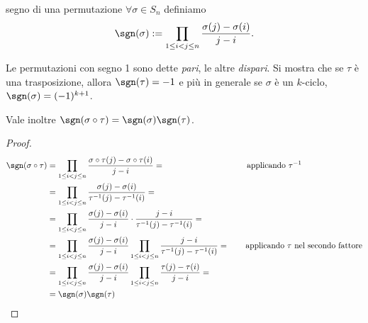 \begin{definition}{segno di una permutazione}
    $\forall \sigma \in S_n$ definiamo \[ \sgn(\sigma) := \prod_{1\leq i<j\leq n} \frac{\sigma(j)-\sigma(i)}{j-i}. \]
\end{definition}
Le permutazioni con segno 1 sono dette \emph{pari}, le altre \emph{dispari}. Si mostra che se $\tau$ è una trasposizione, allora $\sgn(\tau) = -1$ e più in generale se $\sigma$ è un $k$-ciclo, $\sgn(\sigma) = (-1)^{k+1}$.

Vale inoltre $\sgn (\sigma \circ \tau) = \sgn (\sigma)\sgn(\tau)$.
    \begin{proof}
        \begin{align*}
            \sgn(\sigma \circ \tau) & =  \prod_{1\leq i<j\leq n} \frac{\sigma \circ \tau(j)-\sigma \circ \tau(i)}{j-i} = \qquad\qquad\qquad\qquad\qquad\text{applicando $\tau^{-1}$}\\
            & = \prod_{1\leq i<j\leq n} \frac{\sigma(j)-\sigma(i)}{\tau^{-1}(j)-\tau^{-1}(i)} = \\
            & = \prod_{1\leq i<j\leq n} \frac{\sigma(j)-\sigma(i)}{j-i}\cdot \frac{j-i}{\tau^{-1}(j)-\tau^{-1}(i)} = \\
            & = \prod_{1\leq i<j\leq n} \frac{\sigma(j)-\sigma(i)}{j-i} \prod_{1\leq i<j\leq n}  \frac{j-i}{\tau^{-1}(j)-\tau^{-1}(i)} = \qquad \text{applicando $\tau$ nel secondo fattore}\\
            & = \prod_{1\leq i<j\leq n} \frac{\sigma(j)-\sigma(i)}{j-i} \prod_{1\leq i<j\leq n}  \frac{\tau(j)-\tau(i)}{j-i} = \\
            & = \sgn(\sigma)\sgn(\tau)
        \end{align*}
    \end{proof}
    
